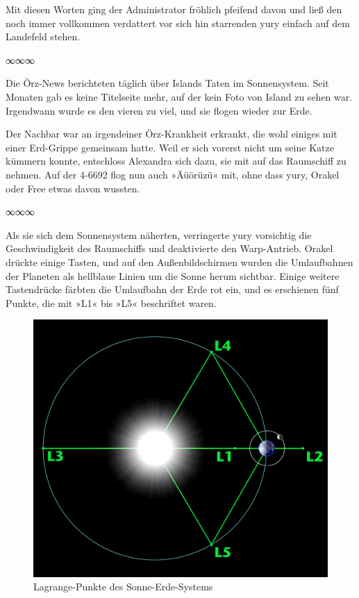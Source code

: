 Mit diesen Worten ging der Administrator fröhlich pfeifend davon und ließ den noch immer vollkommen verdattert vor sich hin starrenden yury einfach auf dem Landefeld stehen.

\begin{center}
    ∞∞∞
\end{center}

Die Örz-News berichteten täglich über Islands Taten im Sonnensystem. Seit Monaten gab es keine Titelseite mehr, auf der kein Foto von Island zu sehen war. Irgendwann wurde es den vieren zu viel, und sie flogen wieder zur Erde.

Der Nachbar war an irgendeiner Örz-Krankheit erkrankt, die wohl einiges mit einer Erd-Grippe gemeinsam hatte. Weil er sich vorerst nicht um seine Katze kümmern konnte, entschloss Alexandra sich dazu, sie mit auf das Raumschiff zu nehmen. Auf der 4-6692 flog nun auch »Äüörüzü« mit, ohne dass yury, Orakel oder Free etwas davon wussten.

\begin{center}
    ∞∞∞
\end{center}

Als sie sich dem Sonnensystem näherten, verringerte yury vorsichtig die Geschwindigkeit des Raumschiffs und deaktivierte den Warp-Antrieb. Orakel drückte einige Tasten, und auf den Außenbildschirmen wurden die Umlaufbahnen der Planeten als hellblaue Linien um die Sonne herum sichtbar. Einige weitere Tastendrücke färbten die Umlaufbahn der Erde rot ein, und es erschienen fünf Punkte, die mit »L1« bis »L5« beschriftet waren.

\begin{figure}[p]
    \includegraphics[width=\linewidth]{z-include-main-lagrange.png}
    \caption{Lagrange-Punkte des Sonne-Erde-Systems}
\end{figure}

